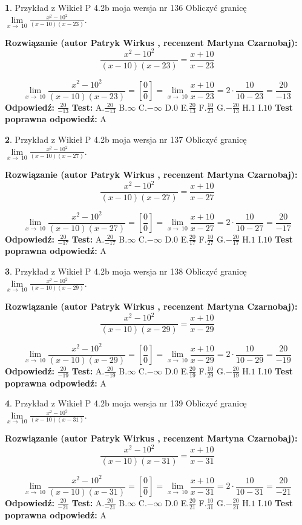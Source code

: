 \documentclass[12pt, a4paper]{article}
\theoremstyle{definition} %
\newtheorem{zad}{}
\newcommand{\zadStart}[1]{\begin{zad}#1\newline}
\newcommand{\zadStop}{\end{zad}}
\newcommand{\rozwStart}[2]{\noindent \textbf{Rozwiązanie (autor #1 , recenzent #2): }\newline}
\newcommand{\rozwStop}{\newline}
\newcommand{\odpStart}{\noindent \textbf{Odpowiedź:}\newline}
\newcommand{\odpStop}{\newline}
\newcommand{\testStart}{\noindent \textbf{Test:}\newline}
\newcommand{\testStop}{\newline}
\newcommand{\kluczStart}{\noindent \textbf{Test poprawna odpowiedź:}\newline}
\newcommand{\kluczStop}{\newline}
\begin{document}
\zadStart{Przykład z Wikieł P 4.2b moja wersja nr 136}
Obliczyć granicę $\lim\limits_{x\to\ 10}\frac{x^{2}-10^{2}}{(x-10)(x-23)}$.
\zadStop
\rozwStart{Patryk Wirkus}{Martyna Czarnobaj}
$$\frac{x^{2}-10^{2}}{(x-10)(x-23)}=\frac{x+10}{x-23}$$

$$\lim\limits_{x\to\ 10}\frac{x^{2}-10^{2}}{(x-10)(x-23)}=[\frac{0}{0}]=\lim\limits_{x\to\ 10}\frac{x+10}{x-23}=2 \cdot \frac{10}{10-23} = \frac{20}{-13}$$
\rozwStop
\odpStart
$\frac{20}{-13}$
\odpStop
\testStart
A.$\frac{20}{-13}$
B.$\infty$
C.$-\infty$
D.$0$
E.$\frac{20}{13}$
F.$\frac{10}{23}$
G.$-\frac{20}{13}$
H.$1$
I.$10$
\testStop
\kluczStart
A
\kluczStop



\zadStart{Przykład z Wikieł P 4.2b moja wersja nr 137}
Obliczyć granicę $\lim\limits_{x\to\ 10}\frac{x^{2}-10^{2}}{(x-10)(x-27)}$.
\zadStop
\rozwStart{Patryk Wirkus}{Martyna Czarnobaj}
$$\frac{x^{2}-10^{2}}{(x-10)(x-27)}=\frac{x+10}{x-27}$$

$$\lim\limits_{x\to\ 10}\frac{x^{2}-10^{2}}{(x-10)(x-27)}=[\frac{0}{0}]=\lim\limits_{x\to\ 10}\frac{x+10}{x-27}=2 \cdot \frac{10}{10-27} = \frac{20}{-17}$$
\rozwStop
\odpStart
$\frac{20}{-17}$
\odpStop
\testStart
A.$\frac{20}{-17}$
B.$\infty$
C.$-\infty$
D.$0$
E.$\frac{20}{17}$
F.$\frac{10}{27}$
G.$-\frac{20}{17}$
H.$1$
I.$10$
\testStop
\kluczStart
A
\kluczStop



\zadStart{Przykład z Wikieł P 4.2b moja wersja nr 138}
Obliczyć granicę $\lim\limits_{x\to\ 10}\frac{x^{2}-10^{2}}{(x-10)(x-29)}$.
\zadStop
\rozwStart{Patryk Wirkus}{Martyna Czarnobaj}
$$\frac{x^{2}-10^{2}}{(x-10)(x-29)}=\frac{x+10}{x-29}$$

$$\lim\limits_{x\to\ 10}\frac{x^{2}-10^{2}}{(x-10)(x-29)}=[\frac{0}{0}]=\lim\limits_{x\to\ 10}\frac{x+10}{x-29}=2 \cdot \frac{10}{10-29} = \frac{20}{-19}$$
\rozwStop
\odpStart
$\frac{20}{-19}$
\odpStop
\testStart
A.$\frac{20}{-19}$
B.$\infty$
C.$-\infty$
D.$0$
E.$\frac{20}{19}$
F.$\frac{10}{29}$
G.$-\frac{20}{19}$
H.$1$
I.$10$
\testStop
\kluczStart
A
\kluczStop



\zadStart{Przykład z Wikieł P 4.2b moja wersja nr 139}
Obliczyć granicę $\lim\limits_{x\to\ 10}\frac{x^{2}-10^{2}}{(x-10)(x-31)}$.
\zadStop
\rozwStart{Patryk Wirkus}{Martyna Czarnobaj}
$$\frac{x^{2}-10^{2}}{(x-10)(x-31)}=\frac{x+10}{x-31}$$

$$\lim\limits_{x\to\ 10}\frac{x^{2}-10^{2}}{(x-10)(x-31)}=[\frac{0}{0}]=\lim\limits_{x\to\ 10}\frac{x+10}{x-31}=2 \cdot \frac{10}{10-31} = \frac{20}{-21}$$
\rozwStop
\odpStart
$\frac{20}{-21}$
\odpStop
\testStart
A.$\frac{20}{-21}$
B.$\infty$
C.$-\infty$
D.$0$
E.$\frac{20}{21}$
F.$\frac{10}{31}$
G.$-\frac{20}{21}$
H.$1$
I.$10$
\testStop
\kluczStart
A
\kluczStop
\end{document}
